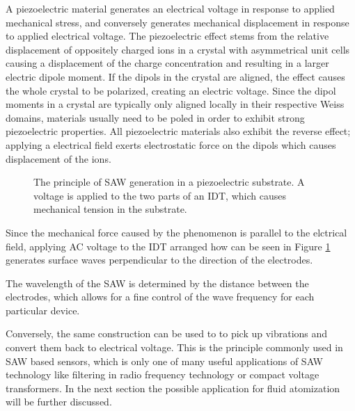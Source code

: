 A piezoelectric material generates an electrical voltage in response to applied mechanical stress, and conversely generates mechanical displacement in response to applied electrical voltage. 
The piezoelectric effect stems from the relative displacement of oppositely charged ions in a crystal with asymmetrical unit cells causing a displacement of the charge concentration and resulting in a larger electric dipole moment. 
If the dipols in the crystal are aligned, the effect causes the whole crystal to be polarized, creating an electric voltage. 
Since the dipol moments in a crystal are typically only aligned locally in their respective Weiss domains, materials usually need to be poled in order to exhibit strong piezoelectric properties. \cite{liLeadfreePiezoelectricMaterials2021}
All piezoelectric materials also exhibit the reverse effect; applying a electrical field exerts electrostatic force on the dipols which causes displacement of the ions.

\begin{figure}[htbp]
    \centering
    \caption{The principle of SAW generation in a piezoelectric substrate. A voltage is applied to the two parts of an IDT, which causes mechanical tension in the substrate.}
    \label{fig:idt}
\end{figure}

Since the mechanical force caused by the phenomenon is parallel to the elctrical field, applying AC voltage to the IDT arranged how can be seen in Figure \ref{fig:idt} generates surface waves perpendicular to the direction of the electrodes.

The wavelength of the SAW is determined by the distance between the electrodes, which allows for a fine control of the wave frequency for each particular device.

Conversely, the same construction can be used to to pick up vibrations and convert them back to electrical voltage. 
This is the principle commonly used in SAW based sensors, which is only one of many useful applications of SAW technology like filtering in radio frequency technology or compact voltage transformers. 
In the next section the possible application for fluid atomization will be further discussed.
